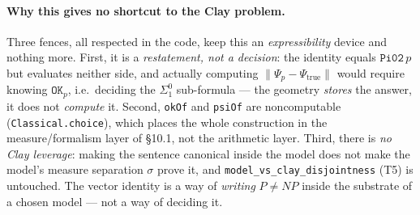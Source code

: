 \documentclass[11pt,a4paper]{report}
\begin{document}
\paragraph{Why this gives no shortcut to the Clay problem.} Three fences, all
respected in the code, keep this an \emph{expressibility} device and nothing more.
First, it is a \emph{restatement, not a decision}: the identity equals
\(\texttt{Pi02}\,p\) but evaluates neither side, and actually computing
\(\lVert \Psi_p - \Psi_{\mathrm{true}}\rVert\) would require knowing
\(\texttt{OK}_p\), i.e.\ deciding the \(\Sigma^0_1\) sub-formula --- the geometry
\emph{stores} the answer, it does not \emph{compute} it. Second, \texttt{okOf} and
\texttt{psiOf} are noncomputable (\texttt{Classical.choice}), which places the
whole construction in the measure/formalism layer of \S10.1, not the arithmetic
layer. Third, there is \emph{no Clay leverage}: making the sentence canonical
inside the model does not make the model's measure separation \(\sigma\) prove it,
and \texttt{model\_vs\_clay\_disjointness} (T5) is untouched. The vector identity
is a way of \emph{writing} \(P \neq NP\) inside the substrate of a chosen model ---
not a way of deciding it.
\end{document}

